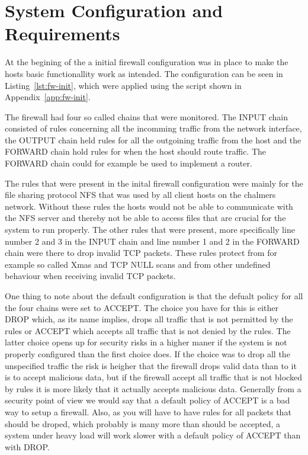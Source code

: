\section{System Configuration and Requirements}
\label{sec:setup}

At the begining of the \lab a initial firewall configuration was in place to make the hosts basic functionallity work as intended. The configuration can be seen in Listing~\ref{lst:fw-init}, which were applied using the script shown in Appendix~\ref{app:fw-init}. 

The firewall had four so called chains that were monitored. The INPUT chain consisted of rules concerning all the incomming traffic from the network interface, the OUTPUT chain held rules for all the outgoining traffic from the host and the FORWARD chain hold rules for when the host should route traffic. The FORWARD chain could for example be used to implement a router.

The rules that were present in the inital firewall configuration were mainly for the file sharing protocol NFS that was used by all client hosts on the chalmers network. Without these rules the hosts would not be able to communicate with the NFS server and thereby not be able to access files that are crucial for the system to run properly. The other rules that were present, more specifically line number 2 and 3 in the INPUT chain and line number 1 and 2 in the FORWARD chain were there to drop invalid TCP packets. These rules protect from for example so called Xmas and TCP NULL scans and from other undefined behaviour when receiving invalid TCP packets.

One thing to note about the default configuration is that the defualt policy for all the four chains were set to ACCEPT. The choice you have for this is either DROP which, as its name implies, drops all traffic that is not permitted by the rules or ACCEPT which accepts all traffic that is not denied by the rules. The latter choice opens up for security risks in a higher maner if the system is not properly configured than the first choice does. If the choice was to drop all the unspecified traffic the risk is heigher that the firewall drops valid data than to it is to accept malicious data, but if the firewall accept all traffic that is not blocked by rules it is more likely that it actually accepts malicious data. Generally from a security point of view we would say that a default policy of ACCEPT is a bad way to setup a firewall. Also, as you will have to have rules for all packets that should be droped, which probably is many more than should be accepted, a system under heavy load will work slower with a default policy of ACCEPT than with DROP.

\newpage


